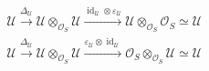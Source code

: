 \(
\begin{gathered}
\mathcal U
  \xrightarrow{\Delta_{\mathcal U}}
\mathcal U\otimes_{\mathcal O_S}\mathcal U
  \xrightarrow{\operatorname{id}_{\mathcal U}\otimes\varepsilon_{\mathcal U}}
\mathcal U\otimes_{\mathcal O_S}\mathcal O_S
\simeq\mathcal U
\\[0.6em]
\mathcal U
  \xrightarrow{\Delta_{\mathcal U}}
\mathcal U\otimes_{\mathcal O_S}\mathcal U
  \xrightarrow{\varepsilon_{\mathcal U}\otimes\operatorname{id}_{\mathcal U}}
\mathcal O_S\otimes_{\mathcal O_S}\mathcal U
\simeq\mathcal U
\end{gathered}
\)
